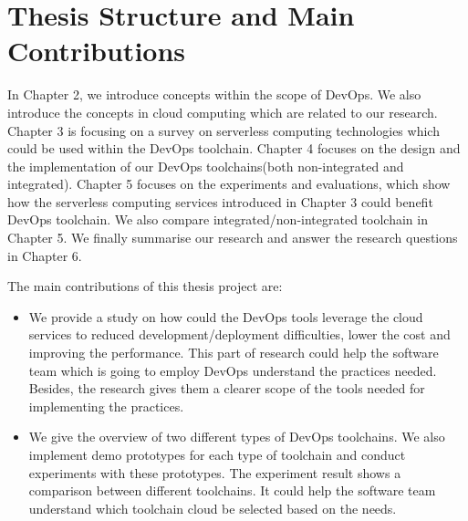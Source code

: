 \section{Thesis Structure and Main Contributions}
In Chapter 2, we introduce concepts within the scope of DevOps. We also introduce the concepts in cloud computing which are related to our research. Chapter 3 is focusing on a survey on serverless computing technologies which could be used within the DevOps toolchain. Chapter 4 focuses on the design and the implementation of our DevOps toolchains(both non-integrated and integrated). Chapter 5 focuses on the experiments and evaluations, which show how the serverless computing services introduced in Chapter 3 could benefit DevOps toolchain. We also compare integrated/non-integrated toolchain in Chapter 5. We finally summarise our research and answer the research questions in Chapter 6.
\par
The main contributions of this thesis project are:
\begin{itemize}
    \item We provide a study on how could the DevOps tools leverage the cloud services to reduced development/deployment difficulties, lower the cost and improving the performance. This part of research could help the software team which is going to employ DevOps understand the practices needed. Besides, the research gives them a clearer scope of the tools needed for implementing the practices.
    \item We give the overview of two different types of DevOps toolchains. We also implement demo prototypes for each type of toolchain and conduct experiments with these prototypes. The experiment result shows a comparison between different toolchains. It could help the software team understand which toolchain cloud be selected based on the needs.
\end{itemize}